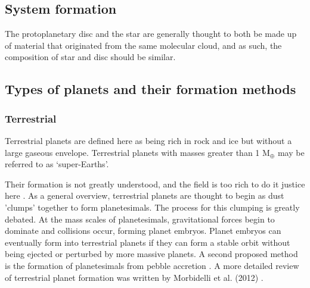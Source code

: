 \documentclass[a4paper,twocolumn,12pt]{article}
\begin{document}
%
%
%

\subsection{System formation}
\label{subsection: System formation}
The protoplanetary disc and the star are generally thought to both be made up of material that originated from the same molecular cloud, and as such, the composition of star and disc should be similar.%



\subsection{Types of planets and their formation methods}
\label{section: Planet formation}
\subsubsection{Terrestrial}
Terrestrial planets are defined here as being rich in rock and ice but without a large gaseous envelope. Terrestrial planets with masses greater than 1 M$ _\oplus$ may be referred to as `super-Earths'.

Their formation is not greatly understood, and the field is too rich to do it justice here \cite{EarthFormation}. As a general overview, terrestrial planets are thought to begin as dust 'clumps' together to form planetesimals.  The process for this clumping is greatly debated. At the mass scales of planetesimals, gravitational forces begin to dominate and collisions occur, forming planet embryos. Planet embryos can eventually form into terrestrial planets if they can form a stable orbit without being ejected or perturbed by more massive planets. A second proposed method is the formation of planetesimals from pebble accretion \cite{PebbleAccretion}. A more detailed review of terrestrial planet formation was written by Morbidelli et al. (2012) \cite{EarthFormation}. 
\end{document}
